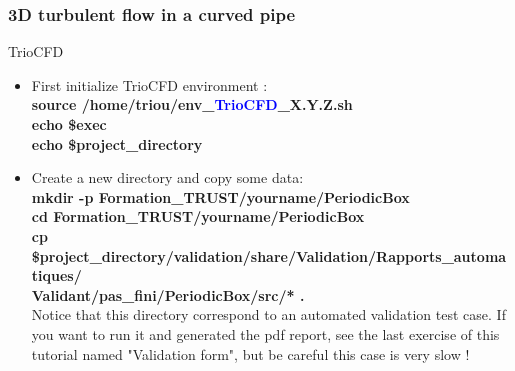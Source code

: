 \documentclass[10pt, hyperref={unicode=true,pdfusetitle, bookmarks=true,bookmarksnumbered=false,bookmarksopen=false, breaklinks=false,pdfborder={0 0 1},backref=true,colorlinks=true,linkcolor=darkblue,pageanchor}]{beamer}
\begin{document}
\begin{frame}
\frametitle{3D turbulent flow in a curved pipe}
\begin{block}{TrioCFD}

\begin{itemize}
\item First initialize TrioCFD environment :\\
{\small{
\textbf{source /home/triou/env\_\textcolor{blue}{TrioCFD}\_X.Y.Z.sh }\\
\textbf{echo \$exec} \\
\textbf{echo \$project\_directory} \\
}}

\item Create a new directory and copy some data:\\
{\small{
\textbf{mkdir -p Formation\_TRUST/yourname/PeriodicBox} \\
\textbf{cd Formation\_TRUST/yourname/PeriodicBox} \\
\textbf{cp \$project\_directory/validation/share/Validation/Rapports\_automatiques/} \\
\hspace{4cm} \textbf{Validant/pas\_fini/PeriodicBox/src/* \; .} \\
}}
\vspace{0.2cm}
Notice that this directory correspond to an automated validation test case. 
If you want to run it and generated the pdf report, see the last exercise of this tutorial named "Validation form", but be careful this case is very slow !
\end{itemize}

\end{block}
\end{frame}
\end{document}
